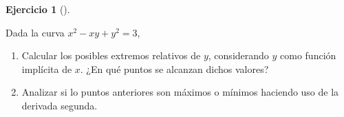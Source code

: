 \documentclass[
  a4paper,
]{scrreport}
\providecommand{\tightlist}{%
  \setlength{\itemsep}{0pt}\setlength{\parskip}{0pt}}\usepackage{longtable,booktabs,array}
\theoremstyle{definition}
\newtheorem{exercise}{Ejercicio}[chapter]
\theoremstyle{remark}
\begin{document}
\leavevmode{}%
\begin{exercise}[]\label{exr-derivada-implicita-5}

Dada la curva \(x^2-xy+y^2=3\),

\begin{enumerate}
\def\labelenumi{\alph{enumi}.}
\tightlist
\item
  Calcular los posibles extremos relativos de \(y\), considerando \(y\)
  como función implícita de \(x\). ¿En qué puntos se alcanzan dichos
  valores?
\item
  Analizar si lo puntos anteriores son máximos o mínimos haciendo uso de
  la derivada segunda.
\end{enumerate}

\end{exercise}
\end{document}
